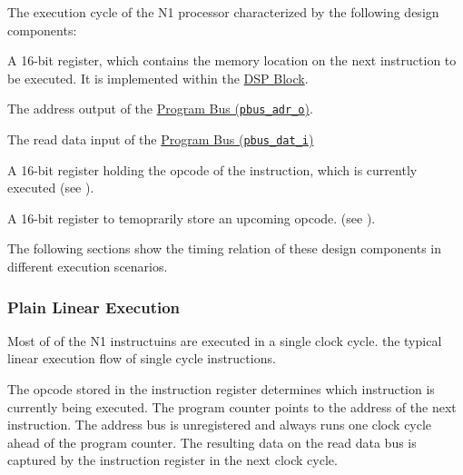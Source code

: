 The execution cycle of the N1 processor characterized by the following design components:
\begin{description}[style=nextline]

\item[\textbf{Program Counter}]
A 16-bit register, which contains the memory location on the next instruction to be executed.  
It is implemented within the \hyperref[architecture:comp:dsp]{DSP Block}.

\item[\textbf{Address Bus}]
The address output of the \hyperref[integration:if:pbus]{Program Bus (\texttt{pbus\_adr\_o})}.

\item[\textbf{Read Data Bus}]
The read data input of the \hyperref[integration:if:pbus]{Program Bus (\texttt{pbus\_dat\_i})}

\item[\textbf{Instruction Register}]
A 16-bit register holding the opcode of the instruction, which is currently executed (see ).

\item[\textbf{Instruction Stash Register}]
A 16-bit register to temoprarily store an upcoming opcode. (see ).

\end{description}

The following sections show the timing relation of these design components in different execution scenarios.


\subsubsection{Plain Linear Execution}
\label{architecture:excyc:linear}

Most of of the  N1 instructuins are executed in a single clock cycle.
 the typical linear execution flow of single cycle instructions.

The opcode stored in the instruction register determines which instruction is currently being executed.
The program counter points to the address of the next instruction.
The address bus is unregistered and always runs one clock cycle ahead of the program counter. 
The resulting data on the read data bus is captured by the instruction register in the next clock cycle.

